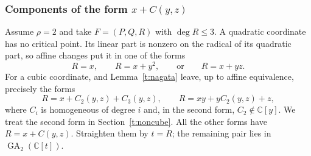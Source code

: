 \documentclass[11pt,reqno]{amsart}
\numberwithin{equation}{section}
\theoremstyle{plain}
\theoremstyle{definition}
\theoremstyle{remark}
\newcommand{\C}{\mathbb C}
\newcommand{\GA}{\operatorname{GA}}
\begin{document}
\subsubsection{Components of the form \texorpdfstring{$x+C(y,z)$}{x+C(y,z)}}
Assume $\rho=2$ and take $F=(P,Q,R)$ with $\deg R\le3$.
A quadratic coordinate has no critical point. Its linear part is nonzero on
the radical of its quadratic part, so affine changes put it in one of the forms
\[
 R=x,\qquad R=x+y^2,\qquad\text{or}\qquad R=x+yz.
\]
For a cubic coordinate, \cite[Theorem 3, I]{BVS} and Lemma~\ref{t:nagata}
leave, up to affine equivalence, precisely the forms
\[
 R=x+C_2(y,z)+C_3(y,z),\qquad R=xy+yC_2(y,z)+z,
\]
where $C_i$ is homogeneous of degree $i$ and, in the second form,
$C_2\notin\C[y]$. We treat the second form in Section~\ref{t:noncube}.
All the other forms have $R=x+C(y,z)$. Straighten them by $t=R$;
the remaining pair lies in $\GA_2(\C[t])$.
\end{document}
